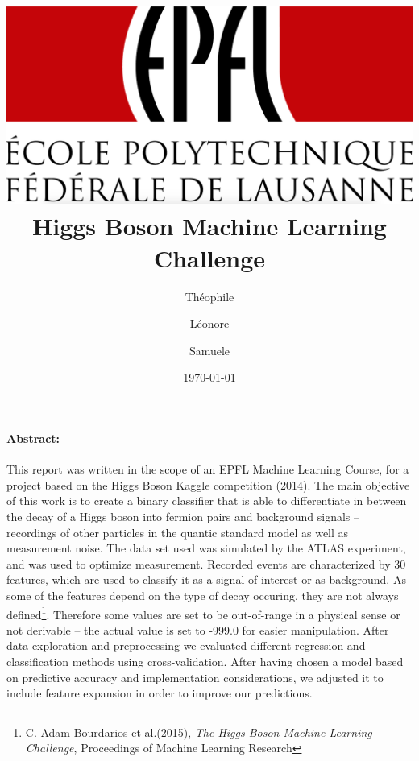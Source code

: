 \documentclass[10pt,a4paper]{article}
\title{
	\vspace*{-1.3cm}
	\includegraphics[scale=0.1]{epfllogo.png}\\
	\vspace*{0.3cm}
	\large{\textbf{Higgs Boson Machine Learning Challenge}}}
\date{\normalsize{\today}} %
\author{\normalsize{Th\' eophile 	\sc{Bian}} \and \normalsize{L\' eonore \sc{Guillain}} \and \normalsize{Samuele \sc{Mercan}}}
\begin{document}
\maketitle


\paragraph{Abstract:} This report was written in the scope of an EPFL Machine Learning Course, for a project based on the Higgs Boson Kaggle competition (2014). The main objective of this work is to create a binary classifier that is able to differentiate in between the decay of a Higgs boson into fermion pairs and background signals -- recordings of other particles in the quantic standard model as well as measurement noise. The data set used was simulated by the ATLAS experiment, and was used to optimize measurement. Recorded events are characterized by 30 features, which are used to classify it as a signal of interest or as background. As some of the features depend on the type of decay occuring, they are not always defined\footnote{C. Adam-Bourdarios et al.(2015), \textit{The Higgs Boson Machine Learning Challenge}, Proceedings of Machine Learning Research}. Therefore some values are set to be out-of-range in a physical sense or not derivable -- the actual value is set to -999.0 for easier manipulation. After data exploration and preprocessing we evaluated different regression and classification methods using cross-validation. After having chosen a model based on predictive accuracy and implementation considerations, we adjusted it to include feature expansion in order to improve our predictions.
	
\end{document}
